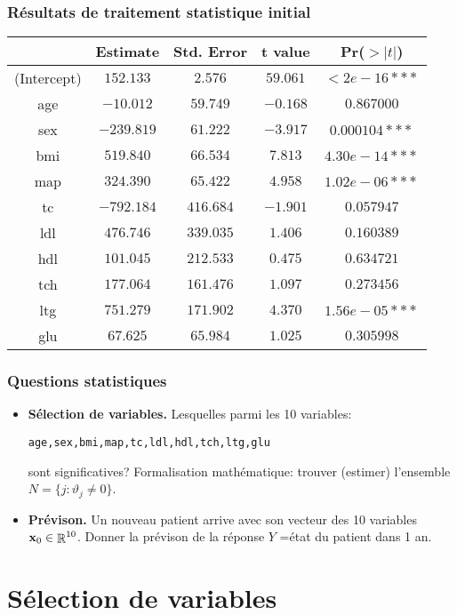 \documentclass{beamer}
\DeclareMathOperator{\R}{{\mathbb R}}
\begin{document}
\begin{frame}
\frametitle{Résultats de traitement statistique initial}
\begin{tabular}{|c||c|c|c|c|}
\hline &Estimate&Std. Error&t value&Pr($>|t|$)\\\hline
(Intercept) &$152.133$&$2.576$&$59.061$&$< 2e-16***$\\
age&$-10.012$&$59.749$&$ -0.168$&$0.867000$\\\hline
sex &$-239.819$&$61.222$&$-3.917$&$0.000104***$\\
bmi&$519.840$&$66.534$&$7.813$&$4.30e-14***$\\\hline
map&$324.390$&$65.422$&$4.958$&$1.02e-06***$\\
tc&$-792.184$&$416.684$&$-1.901$&$0.057947$\\\hline
ldl&$476.746$&$339.035$&$1.406$&$0.160389$\\
hdl&$101.045$&$212.533 $&$0.475$&$0.634721$\\\hline
tch&$177.064$&$161.476$&$ 1.097$&$0.273456$\\
ltg&$751.279$&$ 171.902$&$4.370$&$ 1.56e-05***$\\\hline
glu&$67.625$&$ 65.984$&$1.025$&$0.305998$\\\hline
\end{tabular}
\end{frame}

\begin{frame}
\frametitle{Questions statistiques}
\begin{itemize}
\item {\bf Sélection de variables.} Lesquelles parmi les 10
variables:\\\vspace{3mm}
\centerline{\texttt{age,sex,bmi,map,tc,ldl,hdl,tch,ltg,glu}}\vspace{3mm}
sont significatives? Formalisation mathématique: trouver (estimer)
l'ensemble $N= \{j: \vartheta_{j}\ne 0\}$.
\item {\bf Prévison.} Un nouveau patient arrive avec son vecteur
des 10 variables ${\bf x}_0\in \R^{10}$. Donner la prévison de la
réponse $Y$ =état du patient dans 1 an.
\end{itemize}
\end{frame}

\section{Sélection de variables}
\end{document}

